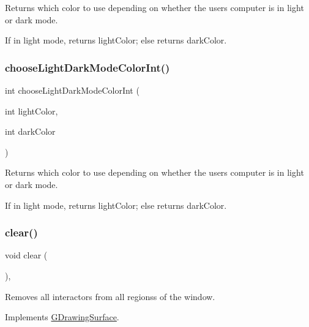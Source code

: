 Returns which color to use depending on whether the user\textquotesingle{}s computer is in light or dark mode. 

If in light mode, returns light\+Color; else returns dark\+Color. \mbox{\label{classsgl_1_1GWindow_a8364f5a4c8622d07ccc83bdc3acc4f19}} 
\subsubsection{\texorpdfstring{choose\+Light\+Dark\+Mode\+Color\+Int()}{chooseLightDarkModeColorInt()}}
{\footnotesize\ttfamily int choose\+Light\+Dark\+Mode\+Color\+Int (\begin{DoxyParamCaption}\item[{int}]{light\+Color,  }\item[{int}]{dark\+Color }\end{DoxyParamCaption})\hspace{0.3cm}{\ttfamily [static]}}



Returns which color to use depending on whether the user\textquotesingle{}s computer is in light or dark mode. 

If in light mode, returns light\+Color; else returns dark\+Color. \mbox{\label{classsgl_1_1GWindow_aee7cb2065b88d21ac4ad05bc997ecf82}} 
\subsubsection{\texorpdfstring{clear()}{clear()}}
{\footnotesize\ttfamily void clear (\begin{DoxyParamCaption}{ }\end{DoxyParamCaption})\hspace{0.3cm}{\ttfamily [override]}, {\ttfamily [virtual]}}



Removes all interactors from all regionss of the window. 



Implements \mbox{\hyperlink{classsgl_1_1GDrawingSurface_a5eeb94d22b8366d1b68d0614384802fe}{G\+Drawing\+Surface}}.

